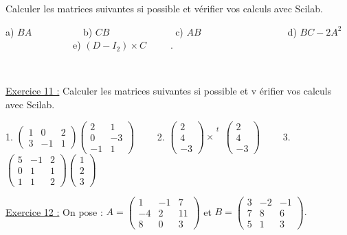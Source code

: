 \documentclass{article}
\begin{document}
Calculer les matrices suivantes si possible et v\'{e}rifier vos calculs avec
Scilab.

a) $BA$ \ \ \ \ \ \ \ \ \ \ b) $CB$ \ \ \ \ \ \ \ \ \ \ \ \ \ c) $AB$\ \ \ \
\ \ \ \ \ \ \ \ \ \ \ \ \ \ d) $BC-2A^{2}$\ \ \ \ \ \ \ \ \ \ \ \ \ \ e) $%
\left( D-I_{2}\right) \times C$\ \ \ \ \ .

\ \ 

\underline{Exercice 11 :} Calculer les matrices suivantes si possible et v%
\'{e}rifier vos calculs avec Scilab.

1. $\left( 
\begin{array}{ccc}
1 & 0 & 2 \\ 
3 & -1 & 1%
\end{array}%
\right) \left( 
\begin{array}{cc}
2 & 1 \\ 
0 & -3 \\ 
-1 & 1%
\end{array}%
\right) $ \ \ \ \ 2. $\left( 
\begin{array}{c}
2 \\ 
4 \\ 
-3%
\end{array}%
\right) \times ^{\substack{ t  \\  \\ }}\left( 
\begin{array}{c}
2 \\ 
4 \\ 
-3%
\end{array}%
\right) $ \ \ \ \ 3. $\left( 
\begin{array}{ccc}
5 & -1 & 2 \\ 
0 & 1 & 1 \\ 
1 & 1 & 2%
\end{array}%
\right) \left( 
\begin{array}{c}
1 \\ 
2 \\ 
3%
\end{array}%
\right) $ \ \ \ \ \ 

\underline{Exercice 12 :} On pose : $A=\left( 
\begin{array}{ccc}
1 & -1 & 7 \\ 
-4 & 2 & 11 \\ 
8 & 0 & 3%
\end{array}%
\right) $ et $B=\left( 
\begin{array}{ccc}
3 & -2 & -1 \\ 
7 & 8 & 6 \\ 
5 & 1 & 3%
\end{array}%
\right) .$
\end{document}
